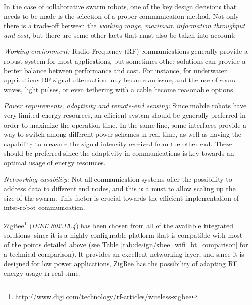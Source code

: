 In the case of collaborative swarm robots, one of the key design decisions that needs to be made is the selection of a proper communication method. Not only there is a trade-off between the \emph{working range, maximum information throughput and cost}, but there are some other facts that must also be taken into account:
\begin{packed_itemize}
\item \emph{Working environment:} Radio-Frequency (RF) communications generally provide a robust system for most applications, but sometimes other solutions can provide a better balance between performance and cost. For instance, for underwater applications RF signal attenuation may become an issue, and the use of sound waves, light pulses, or even tethering with a cable become reasonable options.
\item \emph{Power requirements, adaptivity and remote-end sensing:} Since mobile robots have very limited energy resources, an efficient system should be generally preferred in order to maximize the operation time. In the same line, some interfaces provide a way to switch among different power schemes in real time, as well as having the capability to measure the signal intensity received from the other end. These should be preferred since the adaptivity in communications is key towards an optimal usage of energy resources.
\item \emph{Networking capability:} Not all communication systems offer the possibility to address data to different end nodes, and this is a must to allow scaling up the size of the swarm. This factor is crucial towards the efficient implementation of inter-robot communication.
\end{packed_itemize}

ZigBee\footnote{\url{http://www.digi.com/technology/rf-articles/wireless-zigbee}} (\emph{IEEE 802.15.4}) has been chosen from all of the available integrated solutions, since it is a highly configurable platform that is compatible with most of the points detailed above (see Table \ref{tab:design/xbee_wifi_bt_comparison} for a technical comparison). It provides an excellent networking layer, and since it is designed for low power applications, ZigBee has the possibility of adapting RF energy usage in real time.



